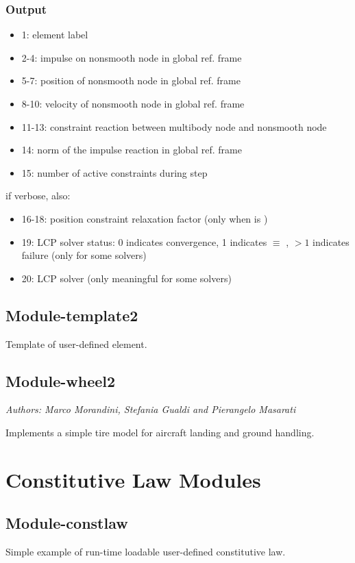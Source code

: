 \subsubsection{Output}
\begin{itemize}
\item 1: element label
\item 2-4:   impulse on nonsmooth node in global ref. frame
\item 5-7:   position of nonsmooth node in global ref. frame
\item 8-10:  velocity of nonsmooth node in global ref. frame
\item 11-13: constraint reaction between multibody node and nonsmooth node
\item 14:    norm of the impulse reaction in global ref. frame
\item 15:    number of active constraints during step
\end{itemize}
if verbose, also:
\begin{itemize}
\item 16-18: position constraint relaxation factor
	(only when  is )
\item 19:    LCP solver status:
	0 indicates convergence,
	1 indicates  $\equiv$ ,
	$>1$ indicates failure
(only for some solvers)
\item 20:    LCP solver 
(only meaningful for some solvers)
\end{itemize}


\subsection{Module-template2}
Template of user-defined element.

\subsection{Module-wheel2}
\emph{Authors: Marco Morandini, Stefania Gualdi and Pierangelo Masarati}

\noindent
Implements a simple tire model for aircraft landing and ground handling.



\section{Constitutive Law Modules}

\subsection{Module-constlaw}
Simple example of run-time loadable user-defined constitutive law.

